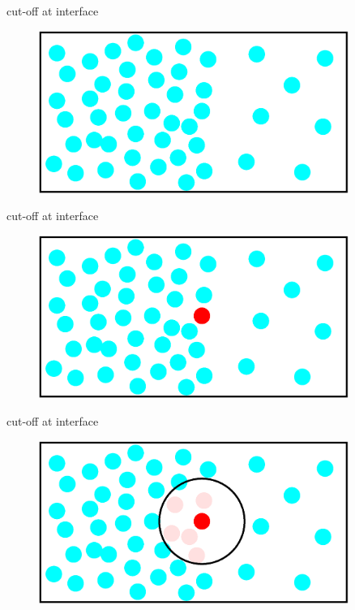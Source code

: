 \documentclass{beamer}
\begin{document}
\begin{frame}{cut-off at interface}
  \begin{figure}
    \centering
    \includegraphics[width=0.9\textwidth]{figs/t0.85-n16000-rc07.5uni/cut-bulk-step00.eps}
  \end{figure}  
\end{frame}


\begin{frame}{cut-off at interface}
  \begin{figure}
    \centering
    \includegraphics[width=0.9\textwidth]{figs/t0.85-n16000-rc07.5uni/cut-interface-step03.eps}
  \end{figure}  
\end{frame}


\begin{frame}{cut-off at interface}
  \begin{figure}
    \centering
    \includegraphics[width=0.9\textwidth]{figs/t0.85-n16000-rc07.5uni/cut-interface-step04.eps}
  \end{figure}  
\end{frame}
\end{document}
